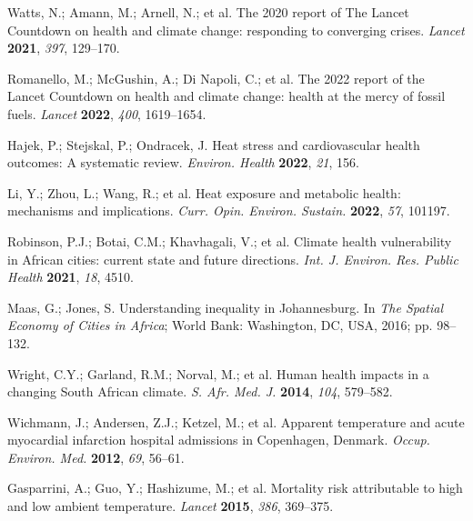 \documentclass[journal,article,submit,pdftex,moreauthors]{Definitions/mdpi}
\begin{document}

\begin{thebibliography}{999}

Watts, N.; Amann, M.; Arnell, N.; et al. The 2020 report of The Lancet Countdown on health and climate change: responding to converging crises. \emph{Lancet} \textbf{2021}, \emph{397}, 129--170.

Romanello, M.; McGushin, A.; Di Napoli, C.; et al. The 2022 report of the Lancet Countdown on health and climate change: health at the mercy of fossil fuels. \emph{Lancet} \textbf{2022}, \emph{400}, 1619--1654.

Hajek, P.; Stejskal, P.; Ondracek, J. Heat stress and cardiovascular health outcomes: A systematic review. \emph{Environ. Health} \textbf{2022}, \emph{21}, 156.

Li, Y.; Zhou, L.; Wang, R.; et al. Heat exposure and metabolic health: mechanisms and implications. \emph{Curr. Opin. Environ. Sustain.} \textbf{2022}, \emph{57}, 101197.

Robinson, P.J.; Botai, C.M.; Khavhagali, V.; et al. Climate health vulnerability in African cities: current state and future directions. \emph{Int. J. Environ. Res. Public Health} \textbf{2021}, \emph{18}, 4510.

Maas, G.; Jones, S. Understanding inequality in Johannesburg. In \emph{The Spatial Economy of Cities in Africa}; World Bank: Washington, DC, USA, 2016; pp. 98--132.

Wright, C.Y.; Garland, R.M.; Norval, M.; et al. Human health impacts in a changing South African climate. \emph{S. Afr. Med. J.} \textbf{2014}, \emph{104}, 579--582.

Wichmann, J.; Andersen, Z.J.; Ketzel, M.; et al. Apparent temperature and acute myocardial infarction hospital admissions in Copenhagen, Denmark. \emph{Occup. Environ. Med.} \textbf{2012}, \emph{69}, 56--61.

Gasparrini, A.; Guo, Y.; Hashizume, M.; et al. Mortality risk attributable to high and low ambient temperature. \emph{Lancet} \textbf{2015}, \emph{386}, 369--375.


\end{thebibliography}
\end{document}
